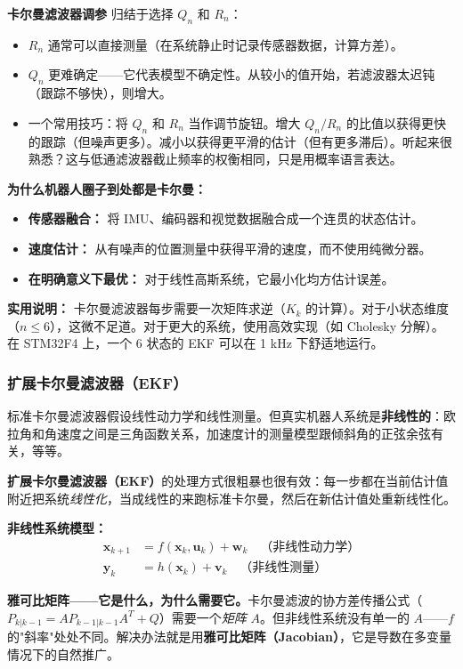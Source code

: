 \textbf{卡尔曼滤波器调参} 归结于选择 $Q_n$ 和 $R_n$：
\begin{itemize}
    \item $R_n$ 通常可以直接测量（在系统静止时记录传感器数据，计算方差）。
    \item $Q_n$ 更难确定——它代表模型不确定性。从较小的值开始，若滤波器太迟钝（跟踪不够快），则增大。
    \item 一个常用技巧：将 $Q_n$ 和 $R_n$ 当作调节旋钮。增大 $Q_n / R_n$ 的比值以获得更快的跟踪（但噪声更多）。减小以获得更平滑的估计（但有更多滞后）。听起来很熟悉？这与低通滤波器截止频率的权衡相同，只是用概率语言表达。
\end{itemize}

\textbf{为什么机器人圈子到处都是卡尔曼：}
\begin{itemize}
    \item \textbf{传感器融合：} 将 IMU、编码器和视觉数据融合成一个连贯的状态估计。
    \item \textbf{速度估计：} 从有噪声的位置测量中获得平滑的速度，而不使用纯微分器。
    \item \textbf{在明确意义下最优：} 对于线性高斯系统，它最小化均方估计误差。
\end{itemize}

\textbf{实用说明：} 卡尔曼滤波器每步需要一次矩阵求逆（$K_k$ 的计算）。对于小状态维度（$n \leq 6$），这微不足道。对于更大的系统，使用高效实现（如 Cholesky 分解）。在 STM32F4 上，一个 6 状态的 EKF 可以在 1 kHz 下舒适地运行。

\subsubsection{扩展卡尔曼滤波器（EKF）}

标准卡尔曼滤波器假设线性动力学和线性测量。但真实机器人系统是\textbf{非线性的}：欧拉角和角速度之间是三角函数关系，加速度计的测量模型跟倾斜角的正弦余弦有关，等等。

\textbf{扩展卡尔曼滤波器（EKF）}的处理方式很粗暴也很有效：每一步都在当前估计值附近把系统\textit{线性化}，当成线性的来跑标准卡尔曼，然后在新估计值处重新线性化。

\textbf{非线性系统模型：}
\begin{align}
\mathbf{x}_{k+1} &= f(\mathbf{x}_k, \mathbf{u}_k) + \mathbf{w}_k \quad \text{（非线性动力学）} \\
\mathbf{y}_k &= h(\mathbf{x}_k) + \mathbf{v}_k \quad \text{（非线性测量）}
\end{align}

\textbf{雅可比矩阵——它是什么，为什么需要它。}\;卡尔曼滤波的协方差传播公式（$P_{k|k-1} = A P_{k-1|k-1} A^T + Q$）需要一个\emph{矩阵} $A$。但非线性系统没有单一的 $A$——$f$ 的"斜率"处处不同。解决办法就是用\textbf{雅可比矩阵（Jacobian）}，它是导数在多变量情况下的自然推广。

